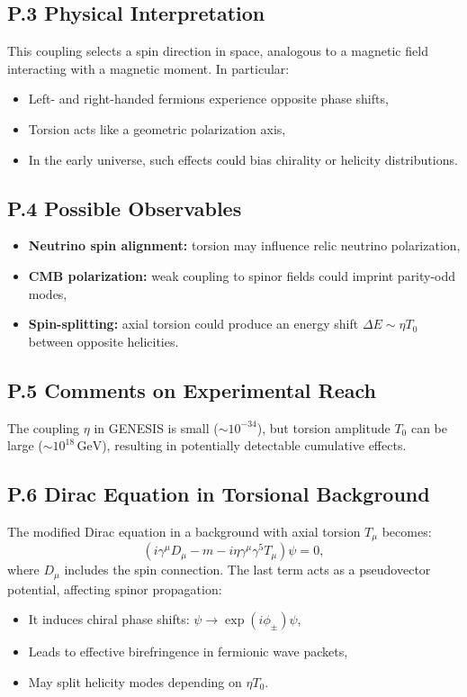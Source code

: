 \documentclass{article}
\begin{document}
\subsection*{P.3 Physical Interpretation}
This coupling selects a spin direction in space, analogous to a magnetic field interacting with a magnetic moment. In particular:
\begin{itemize}
  \item Left- and right-handed fermions experience opposite phase shifts,
  \item Torsion acts like a geometric polarization axis,
  \item In the early universe, such effects could bias chirality or helicity distributions.
\end{itemize}

\subsection*{P.4 Possible Observables}
\begin{itemize}
  \item \textbf{Neutrino spin alignment:} torsion may influence relic neutrino polarization,
  \item \textbf{CMB polarization:} weak coupling to spinor fields could imprint parity-odd modes,
  \item \textbf{Spin-splitting:} axial torsion could produce an energy shift \(\Delta E \sim \eta T_0\) between opposite helicities.
\end{itemize}

\subsection*{P.5 Comments on Experimental Reach}
The coupling \(\eta\) in GENESIS is small (\(\sim 10^{-34}\)), but torsion amplitude \(T_0\) can be large (\(\sim 10^{18}\,\mathrm{GeV}\)), resulting in potentially detectable cumulative effects.

\subsection*{P.6 Dirac Equation in Torsional Background}
The modified Dirac equation in a background with axial torsion \(T_\mu\) becomes:
\begin{equation}
\left(i \gamma^\mu D_\mu - m - i \eta \gamma^\mu \gamma^5 T_\mu\right) \psi = 0,
\end{equation}
where \(D_\mu\) includes the spin connection. The last term acts as a pseudovector potential, affecting spinor propagation:
\begin{itemize}
  \item It induces chiral phase shifts: \(\psi \to \exp(i \phi_\pm) \psi\),
  \item Leads to effective birefringence in fermionic wave packets,
  \item May split helicity modes depending on \(\eta T_0\).
\end{itemize}
\end{document}
